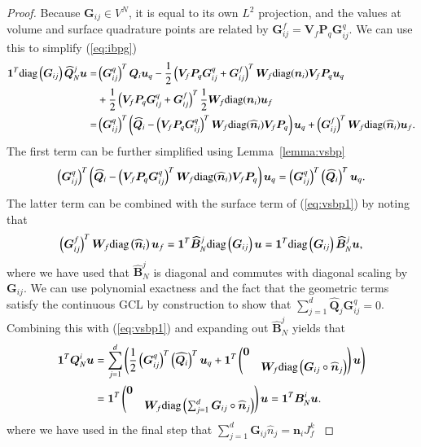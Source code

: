 \documentclass[preprint,10pt]{elsarticle}
\theoremstyle{definition}
\theoremstyle{lemma}
\theoremstyle{corollary}
\theoremstyle{theorem}
\theoremstyle{assumption}
\renewcommand{\hat}[1]{\widehat{#1}}
\newcommand{\LRp}[1]{\left( #1 \right)}
\newcommand{\diag}[1]{{\rm diag}\LRp{#1}}
\begin{document}
\begin{proof}
Because $\bm{G}_{ij} \in V^N$, it is equal to its own $L^2$ projection, and the values at volume and surface quadrature points are related by $\bm{G}^f_{ij} = \bm{V}_f\bm{P}_q\bm{G}^q_{ij}$.  We can use this to simplify (\ref{eq:ibpg})
\begin{align*}
\bm{1}^T \diag{\bm{G}_{ij}} \hat{\bm{Q}}^j_N \bm{u} =&  \LRp{\bm{G}^q_{ij}}^T { \bm{Q}_i}  \bm{u}_q - \frac{1}{2} \LRp{{\bm{V}_f \bm{P}_q}\bm{G}_{ij}^q+\bm{G}^f_{ij}}^T{\bm{W}_f{\rm diag}({\bm{n}}_i)\bm{V}_f\bm{P}_q}\bm{u}_q\\
&+ \frac{1}{2} \LRp{{\bm{V}_f \bm{P}_q}\bm{G}_{ij}^q+\bm{G}^f_{ij}}^T\frac{1}{2}\bm{W}_f{\rm diag}({\bm{n}}_i)\bm{u}_f\\
=& \LRp{\bm{G}^q_{ij}}^T \LRp{ \hat{\bm{Q}}_i - \LRp{{\bm{V}_f \bm{P}_q}\bm{G}_{ij}^q}^T{\bm{W}_f{\rm diag}(\hat{\bm{n}}_i)\bm{V}_f\bm{P}_q}}\bm{u}_q + \LRp{\bm{G}^f_{ij}}^T\bm{W}_f{\rm diag}(\hat{\bm{n}}_i)\bm{u}_f. %
\end{align*}
The first term can be further simplified using Lemma~\ref{lemma:vsbp}
\[
\LRp{\bm{G}^q_{ij}}^T \LRp{ \hat{\bm{Q}}_i - \LRp{{\bm{V}_f \bm{P}_q}\bm{G}_{ij}^q}^T{\bm{W}_f{\rm diag}(\hat{\bm{n}}_i)\bm{V}_f\bm{P}_q}}\bm{u}_q = \LRp{\bm{G}^q_{ij}}^T \LRp{ \hat{\bm{Q}}_i}^T\bm{u}_q.
\]
The latter term can be combined with the surface term of (\ref{eq:vsbp1}) by noting that 
\[
\LRp{\bm{G}^f_{ij}}^T\bm{W}_f \diag{\hat{\bm{n}}_i}\bm{u}_f =\bm{1}^T\hat{\bm{B}}^j_N\diag{\bm{G}_{ij}}\bm{u} = \bm{1}^T\diag{\bm{G}_{ij}}\hat{\bm{B}}^j_N\bm{u},
\]
where we have used that $\hat{\bm{B}}^j_N$ is diagonal and commutes with diagonal scaling by $\bm{G}_{ij}$.
We can use polynomial exactness and the fact that the geometric terms satisfy the continuous GCL by construction \cite{chan2018discretely} to show that $\sum_{j=1}^d  \hat{\bm{Q}}_j {\bm{G}^q_{ij}} = 0$.
Combining this with (\ref{eq:vsbp1}) and expanding out $\hat{\bm{B}}^j_N$ yields that
\begin{align*}
\bm{1}^T\bm{Q}^i_N\bm{u} &= \sum_{j=1}^d \LRp{
\frac{1}{2}\LRp{\bm{G}^q_{ij}}^T \LRp{ \hat{\bm{Q}_i}}^T \bm{u}_q + \bm{1}^T\begin{pmatrix}
\bm{0} &\\
& \bm{W}_f \diag{\bm{G}_{ij} \circ \hat{\bm{n}}_j}
\end{pmatrix}
\bm{u}} \\
&=  \bm{1}^T\begin{pmatrix}
\bm{0} &\\
& \bm{W}_f \diag{\sum_{j=1}^d \bm{G}_{ij} \circ \hat{\bm{n}}_j}
\end{pmatrix}
\bm{u} = \bm{1}^T\bm{B}^i_N\bm{u}.
\end{align*}
where we have used in the final step that $\sum_{j=1}^d\bm{G}_{ij}\hat{n}_j = \bm{n}_i J^k_f$ \cite{ciarlet1978finite, chan2018discretely}

\end{proof}
\end{document}

